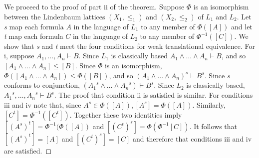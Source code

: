 \documentclass[
  11pt,
  letterpaper,
  DIV=11,
  numbers=noendperiod,
  twoside]{scrartcl}
\begin{document}
We proceed to the proof of part ii of the theorem. Suppose \(\Phi\) is
an isomorphism between the Lindenbaum lattices \((X_1,\le _1)\) and
\((X_2,\le _2)\) of \(L_1\) and \(L_2\). Let \emph{s} map each formula
\(A\) in the language of \(L_1\) to any member of \(\Phi([A])\) and let
\emph{t} map each formula \(C\) in the language of \(L_2\) to any member
of \(\Phi^{-1}([C])\). We show that \emph{s} and \emph{t} meet the four
conditions for weak translational equivalence. For i, suppose
\(A_1,{\ldots},A_n \vdash B\). Since \(L_1\) is classically based
\(A_1\wedge {\ldots}\wedge A_n \vdash B\), and so
\([A_1\wedge {\ldots}\wedge A_n] \le [B]\). Since \(\Phi\) is an
isomorphism, \(\Phi([A_1\wedge {\ldots}\wedge A_n]) \le \Phi([B])\), and
so \((A_1\wedge {\ldots}\wedge A_n)^s \vdash B^s\). Since \emph{s}
conforms to conjunction,
\(({A_1}^s\wedge {\ldots}\wedge {A_n}^s) \vdash B^s\). Since \(L_2\) is
classically based, \({A_1}^s,{\ldots},{A_n}^s \vdash B^s\). The proof
that condition ii is satisfied is similar. For conditions iii and iv
note that, since \(A^s \in \Phi([A]), [A^s]= \Phi([A])\). Similarly,
\([C^t]= \Phi^{-1}([C^t])\). Together these two identities imply
\([(A^s)^t] = \Phi^{-1}(\Phi([A])\) and
\([(C^t)^s]= \Phi(\Phi^{-1}[C])\). It follows that \([(A^s)^t] = [A]\)
and \([(C^t)^s]=[C]\) and therefore that conditions iii and iv are
satisfied.~◻
\end{document}
